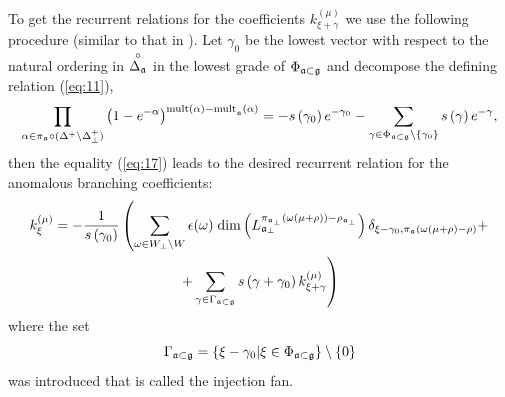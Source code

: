 \documentclass[a4paper,12pt]{article}
\theoremstyle{definition} \newtheorem{Def}{Definition}
\newcommand{\co}[1]{\overset{\circ }{#1}}
\begin{document}
To get the recurrent relations for the coefficients $k^{(\mu)}_{\xi+\gamma}$ we use the following procedure  (similar to that in \cite{ilyin812pbc}).
Let $\gamma_{0} $ be the lowest vector with respect to the natural ordering in $%
\co{\Delta _{\frak{a}}}$ in the lowest grade of $\Phi _{\frak{a}\subset \frak{g}}$ and decompose the defining relation (\ref{eq:11}),
\begin{equation}
  \label{eq:18}
  \prod_{\alpha\in \pi_{\mathfrak{a}}\circ (\Delta^{+}\setminus \Delta^{+}_{\bot})}\left(
    1-e^{-\alpha }\right) ^{\mathrm{{mult}\left( \alpha \right) -{mult}}_{\frak{a%
      }}\mathrm{\left( \alpha \right) }}=-s\left( \gamma _{0}\right) e^{-\gamma
    _{0}}-\sum_{\gamma \in \Phi _{\frak{a}\subset \frak{g}}\setminus \left\{\gamma_{0}\right\}}s\left( \gamma \right) e^{-\gamma },
\end{equation}
then the equality (\ref{eq:17}) leads to the desired recurrent  relation for the anomalous branching coefficients:
\begin{multline}
  k_{\xi }^{\left( \mu \right) }=
  -\frac{1}{s\left( \gamma _{0}\right) }
  \left(
    \sum_{\omega\in W_{\bot}\backslash W} \epsilon(\omega)\; \mathrm{dim}
    \left(L^{\pi_{\mathfrak{a}_{\bot}}(\omega(\mu+\rho))-\rho_{\mathfrak{a}_{\bot}}}_{\mathfrak{a}_{\bot}}\right)
    \delta_{\xi-\gamma_0,\pi_{\mathfrak{a}}(\omega(\mu+\rho)-\rho)}+
    \right.\\
    \left. +
    \sum_{\gamma \in \Gamma _{\frak{a}\subset \frak{g}}} s\left( \gamma +\gamma _{0}\right) k_{\xi+\gamma }^{\left( \mu \right) }
  \right)
\label{recurrent-relation}
\end{multline}
where the set
\begin{equation}
\Gamma _{\frak{a}\subset \frak{g}}=\left\{ \xi -\gamma _{0}|\xi \in \Phi _{%
\frak{a}\subset \frak{g}}\right\} \setminus \left\{ 0\right\} 
\label{fan-defined}
\end{equation}
 was introduced that is called the injection fan.
\end{document}
